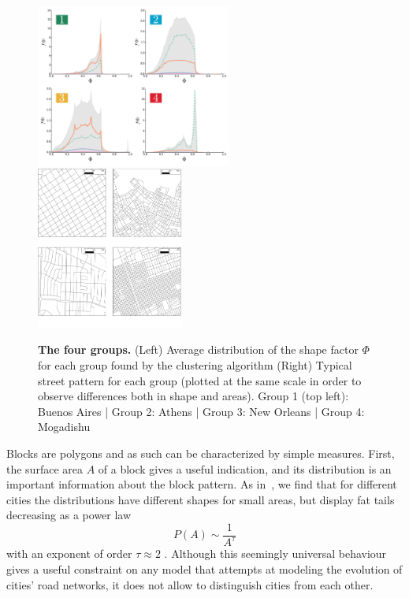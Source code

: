 \begin{figure}
    \center
    \includegraphics[height=2.1in]{./gfx/chapter-networks/groups.pdf}
    \includegraphics[height=2.1in]{./gfx/chapter-networks/groups_patterns.pdf}
    \caption{{\bf The four groups.} (Left) Average distribution of the shape
    factor $\Phi$ for each group found by the clustering algorithm (Right) Typical
    street pattern for each group (plotted at the same scale in order to observe
    differences both in shape and areas). Group 1 (top left): Buenos Aires | Group
    2: Athens | Group 3: New Orleans | Group 4: Mogadishu \label{fig:groups}}
\end{figure}

Blocks are polygons and as such can be characterized by simple measures. First,
the surface area $A$ of a block gives a useful indication, and its distribution
is an important information about the block pattern. As
in~\cite{Lammer:2006,Fialkowski:2008}, we find that for different cities the
distributions have different shapes for small areas, but display fat tails
decreasing as a power law \begin{equation} P(A)\sim \frac{1}{A^\tau}
\end{equation} with an exponent of order $\tau\approx 2$
\cite{Lammer:2006,Barthelemy:2011,Strano:2012,Barthelemy:2013}.
Although this seemingly universal behaviour gives a useful constraint on any
model that attempts at modeling the evolution of cities' road
networks, it does not allow to distinguish cities from each
other.

